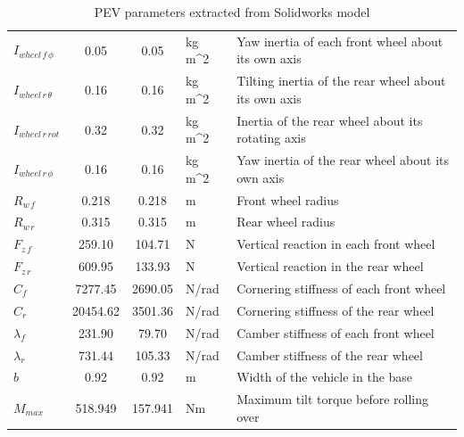 \begin{table}[h!]
\begin{tabular}{l|cc|l|l}
	$I_{wheel\,f\,\phi}$ & 0.05                      & 0.05                        & kg m^2				  & Yaw inertia of each front wheel about its own axis     \\
	$I_{wheel\,r\,\theta}$ & 0.16                      & 0.16                        & kg m^2				  & Tilting inertia of the rear wheel about its own axis   \\
	$I_{wheel\,r\,rot}$  & 0.32                      & 0.32                        & kg m^2				  & Inertia of the rear wheel about its rotating axis      \\
	$I_{wheel\,r\,\phi}$ & 0.16                      & 0.16                        & kg m^2				  & Yaw inertia of the rear wheel about its own axis       \\
	$R_{w\,f}$          & 0.218                     & 0.218                       & m                      & Front wheel radius                                     \\
	$R_{w\,r}$           & 0.315                     & 0.315                       & m                      & Rear wheel radius                                      \\
	$F_{z\,f}$          & 259.10                    & 104.71                      & N                      & Vertical reaction in each front wheel                  \\
	$F_{z\,r}$          & 609.95                    & 133.93                      & N                      & Vertical reaction in the rear wheel                    \\
	$C_f$               & 7277.45                   & 2690.05                     & N/rad                  & Cornering stiffness of each front wheel                \\
	$C_r$               & 20454.62                  & 3501.36                     & N/rad                  & Cornering stiffness of the rear wheel                  \\
	$\lambda_f$          & 231.90                    & 79.70                       & N/rad                  & Camber stiffness of each front wheel                   \\
	$\lambda_r$          & 731.44                    & 105.33                      & N/rad                  & Camber stiffness of the rear wheel                     \\
	$b$                  & 0.92                      & 0.92                        & m                      & Width of the vehicle in the base                       \\
	$M_{max}$            & 518.949                   & 157.941                     & Nm                     & Maximum tilt torque before rolling over    			   \\
	\end{tabular}
	\\[20pt]
	\caption{PEV parameters extracted from Solidworks model}
\end{table}

